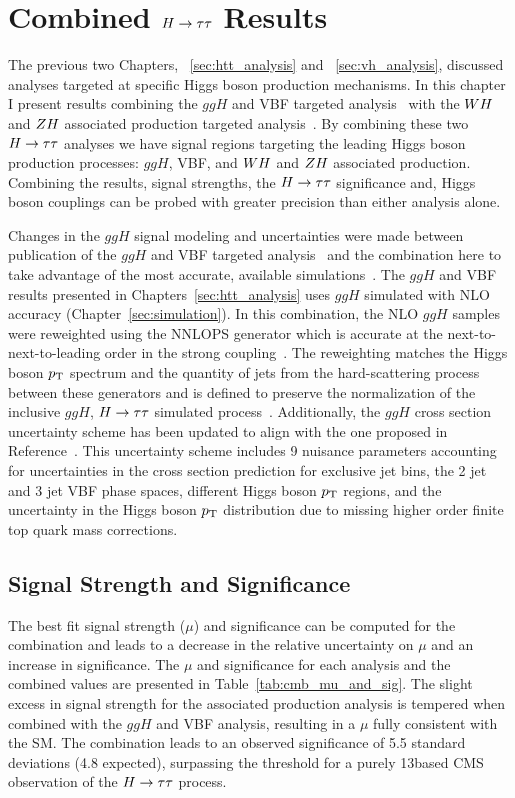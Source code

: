 \chapter{Combined $H\to\tau\tau$ Results}
\label{sec:cmb_results}

The previous two Chapters, ~\ref{sec:htt_analysis} and ~\ref{sec:vh_analysis}, discussed
analyses targeted at specific Higgs boson production mechanisms. In this chapter
I present results combining the 
$ggH$ and VBF targeted analysis~\cite{cms_13TeV_htt_jhep_2017}
with the $WH$ and $ZH$ associated production targeted analysis~\cite{HIG-18-007}.
By combining these two $H\to\tau\tau$ analyses we have signal regions targeting the leading Higgs 
boson production processes: $ggH$, VBF, and $WH$ and $ZH$ associated production. 
Combining the results, signal strengths, the $H\to\tau\tau$ significance and, Higgs
boson couplings can be probed with greater precision than either analysis alone.

Changes in the $ggH$ signal modeling and uncertainties were made between
publication of the $ggH$ and VBF targeted analysis~\cite{cms_13TeV_htt_jhep_2017} 
and the combination here to take advantage of the most accurate, available
simulations~\cite{CMS-PAS-HIG-17-031}.
The $ggH$ and VBF results presented in Chapters~\ref{sec:htt_analysis} uses $ggH$ simulated with NLO 
accuracy (Chapter~\ref{sec:simulation}). In this combination, 
the NLO $ggH$ samples were reweighted using the \textsc{NNLOPS} generator which is accurate at
the next-to-next-to-leading order in the strong coupling~\cite{Hamilton2013}.
The reweighting matches the Higgs boson
$p_\mathrm{T}$ spectrum and the quantity of jets from the hard-scattering process between these generators
and is defined to preserve the normalization
of the inclusive $ggH$, $H\to\tau\tau$ simulated process~\cite{CMS-PAS-HIG-17-031}. 
Additionally, the
$ggH$ cross section uncertainty scheme has been updated to align 
with the one proposed in Reference~\cite{deFlorian:2016spz}.
This uncertainty scheme includes 9 nuisance parameters accounting for uncertainties in the cross 
section prediction for exclusive jet bins, the 2 jet and 3 jet VBF phase spaces, different Higgs boson $p_\mathrm{T}$ 
regions, and the uncertainty in the Higgs boson $p_\mathrm{T}$ distribution due to missing higher order finite 
top quark mass corrections.


\section{Signal Strength and Significance}
The best fit signal strength ($\mu$) and significance can be computed for the combination and
leads to a decrease in the relative uncertainty on $\mu$ and an increase
in significance. The $\mu$ and significance
for each analysis and the combined values are presented in Table~\ref{tab:cmb_mu_and_sig}.
The slight excess in signal strength for the associated production analysis is tempered
when combined with the $ggH$ and VBF analysis, resulting in a $\mu$ fully consistent 
with the SM. The combination leads to an 
observed significance of 5.5 standard deviations (4.8 expected), surpassing the threshold for a
purely 13\TeV based CMS observation of the $H\to\tau\tau$ process.


